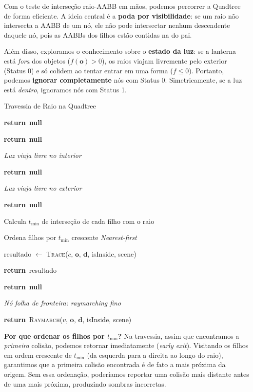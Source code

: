 \documentclass[11pt,a4paper]{article}
\newenvironment{algorithmic}[1][0]{%
    \begin{list}{}{%
        \setlength{\leftmargin}{1.5em}%
        \setlength{\labelsep}{0pt}%
        \setlength{\itemsep}{0pt}%
        \setlength{\topsep}{0pt}%
        \setlength{\parsep}{0pt}%
        \setlength{\partopsep}{0pt}%
    }%
}{%
    \end{list}%
}
\newcommand{\State}{\item[]}
\newcommand{\Procedure}[2]{\item[\textbf{procedure} #1(#2)]}
\newcommand{\EndProcedure}{\item[\textbf{end procedure}]}
\newcommand{\If}[1]{\item[\textbf{if} #1 \textbf{then}]}
\newcommand{\Else}{\item[\textbf{else}]}
\newcommand{\EndIf}{\item[\textbf{end if}]}
\newcommand{\For}[1]{\item[\textbf{for} #1 \textbf{do}]}
\newcommand{\EndFor}{\item[\textbf{end for}]}
\newcommand{\Return}{\textbf{return}~}
\newcommand{\Call}[2]{\textsc{#1}(#2)}
\newcommand{\Comment}[1]{\hfill\textit{#1}}
\theoremstyle{plain}
\theoremstyle{definition}
\newcommand{\vv}[1]{\mathbf{#1}}
\begin{document}
Com o teste de interseção raio-AABB em mãos, podemos percorrer a Quadtree de
forma eficiente. A ideia central é a \textbf{poda por visibilidade}: se um raio
não intersecta a AABB de um nó, ele não pode intersectar nenhum descendente
daquele nó, pois as AABBs dos filhos estão contidas na do pai.

Além disso, exploramos o conhecimento sobre o \textbf{estado da luz}: se a
lanterna está \emph{fora} dos objetos ($f(\vv{o}) > 0$), os raios viajam
livremente pelo exterior (Status 0) e só colidem ao tentar entrar em uma forma
($f \leq 0$). Portanto, podemos \textbf{ignorar completamente} nós com Status 0.
Simetricamente, se a luz está \emph{dentro}, ignoramos nós com Status 1.

\begin{algorithm}[H]
\caption{Travessia de Raio na Quadtree}
\begin{algorithmic}[1]
\Procedure{Trace}{$v$, $\vv{o}$, $\vv{d}$, isInside, scene}
    \If{$v$ é nulo} \Return \textbf{null} \EndIf
    \If{isInside \textbf{and} $v.\text{status} = 1$} \Return \textbf{null} \EndIf
    \Comment{Luz viaja livre no interior}
    \If{\textbf{not} isInside \textbf{and} $v.\text{status} = 0$} \Return \textbf{null} \EndIf
    \Comment{Luz viaja livre no exterior}
    \If{Raio não intersecta AABB de $v$} \Return \textbf{null} \EndIf
    \If{$v$ tem filhos}
        \State Calcula $t_{\min}$ de interseção de cada filho com o raio
        \State Ordena filhos por $t_{\min}$ crescente \Comment{Nearest-first}
        \For{cada filho $c$ em ordem}
            \State resultado $\gets$ \Call{Trace}{$c$, $\vv{o}$, $\vv{d}$, isInside, scene}
            \If{resultado $\neq$ \textbf{null}} \Return resultado \EndIf
        \EndFor
        \Return \textbf{null}
    \Else \Comment{Nó folha de fronteira: raymarching fino}
        \State \Return \Call{Raymarch}{$v$, $\vv{o}$, $\vv{d}$, isInside, scene}
    \EndIf
\EndProcedure
\end{algorithmic}
\end{algorithm}

\begin{tcolorbox}[detalhe]
\textbf{Por que ordenar os filhos por $t_{\min}$?} Na travessia, assim que
encontramos a \emph{primeira} colisão, podemos retornar imediatamente
(\textit{early exit}). Visitando os filhos em ordem crescente de $t_{\min}$
(da esquerda para a direita ao longo do raio), garantimos que a primeira colisão
encontrada é de fato a mais próxima da origem. Sem essa ordenação, poderíamos
reportar uma colisão mais distante antes de uma mais próxima, produzindo sombras
incorretas.
\end{tcolorbox}
\end{document}
